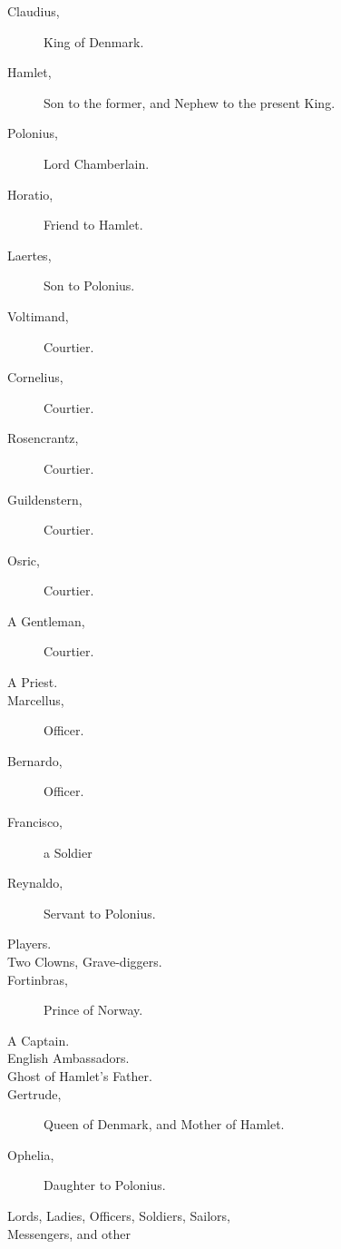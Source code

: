 \documentclass[12pt]{book}
\begin{document}
\begin{description}

\item [Claudius,] King of Denmark.

\item [Hamlet,] Son to the former, and Nephew to the present King.

\item [Polonius,] Lord Chamberlain.

\item [Horatio,] Friend to Hamlet.

\item [Laertes,] Son to Polonius.

\item [Voltimand,] Courtier.

\item [Cornelius,] Courtier.

\item [Rosencrantz,] Courtier.

\item [Guildenstern,] Courtier.

\item [Osric,] Courtier.

\item [A Gentleman,] Courtier.

\item [A Priest.]

\item [Marcellus,] Officer.

\item [Bernardo,] Officer.

\item [Francisco,] a Soldier

\item [Reynaldo,] Servant to Polonius.

\item [Players.]

\item [Two Clowns, Grave-diggers.]

\item [Fortinbras,] Prince of Norway.

\item [A Captain.]

\item [English Ambassadors.]

\item [Ghost of Hamlet's Father.]



\item [Gertrude,] Queen of Denmark, and Mother of Hamlet.

\item [Ophelia,] Daughter to Polonius.



\item [Lords, Ladies, Officers, Soldiers, Sailors,]

\item [Messengers, and other

Attendants.]



\end{description}
\end{document}
